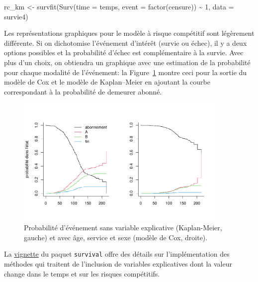 \documentclass[
  11pt,
  letterpaper,
]{scrbook}
\newenvironment{Shaded}{\begin{snugshade}}{\end{snugshade}}
\newcommand{\AttributeTok}[1]{\textcolor[rgb]{0.40,0.45,0.13}{#1}}
\newcommand{\DecValTok}[1]{\textcolor[rgb]{0.68,0.00,0.00}{#1}}
\newcommand{\FunctionTok}[1]{\textcolor[rgb]{0.28,0.35,0.67}{#1}}
\newcommand{\NormalTok}[1]{\textcolor[rgb]{0.00,0.23,0.31}{#1}}
\newcommand{\OtherTok}[1]{\textcolor[rgb]{0.00,0.23,0.31}{#1}}
\newcommand{\SpecialCharTok}[1]{\textcolor[rgb]{0.37,0.37,0.37}{#1}}
\theoremstyle{definition}
\theoremstyle{remark}
\begin{document}
\begin{Shaded}
\begin{Highlighting}[]
\NormalTok{rc\_km }\OtherTok{\textless{}{-}} \FunctionTok{survfit}\NormalTok{(}\FunctionTok{Surv}\NormalTok{(}\AttributeTok{time =}\NormalTok{ temps, }
             \AttributeTok{event =} \FunctionTok{factor}\NormalTok{(censure)) }\SpecialCharTok{\textasciitilde{}} \DecValTok{1}\NormalTok{,}
             \AttributeTok{data =}\NormalTok{ survie4)}
\end{Highlighting}
\end{Shaded}

Les représentations graphiques pour le modèle à risque compétitif sont
légèrement différente. Si on dichotomise l'événement d'intérêt (survie
ou échec), il y a deux options possibles et la probabilité d'échec est
complémentaire à la survie. Avec plus d'un choix, on obtiendra un
graphique avec une estimation de la probabilité pour chaque modalité de
l'événement: la Figure~\ref{fig-competitif} montre ceci pour la sortie
du modèle de Cox et le modèle de Kaplan--Meier en ajoutant la courbe
correspondant à la probabilité de demeurer abonné.

\begin{figure}[ht!]

{\centering \includegraphics[width=0.9\textwidth,height=\textheight]{./06-survie_files/figure-pdf/fig-competitif-1.pdf}

}

\caption{\label{fig-competitif}Probabilité d'événement sans variable
explicative (Kaplan-Meier, gauche) et avec âge, service et sexe (modèle
de Cox, droite).}

\end{figure}

La
\href{https://cran.r-project.org/web/packages/survival/vignettes/timedep.pdf}{vignette}
du paquet \texttt{survival} offre des détails sur l'implémentation des
méthodes qui traitent de l'inclusion de variables explicatives dont la
valeur change dans le temps et sur les risques compétitifs.
\end{document}
